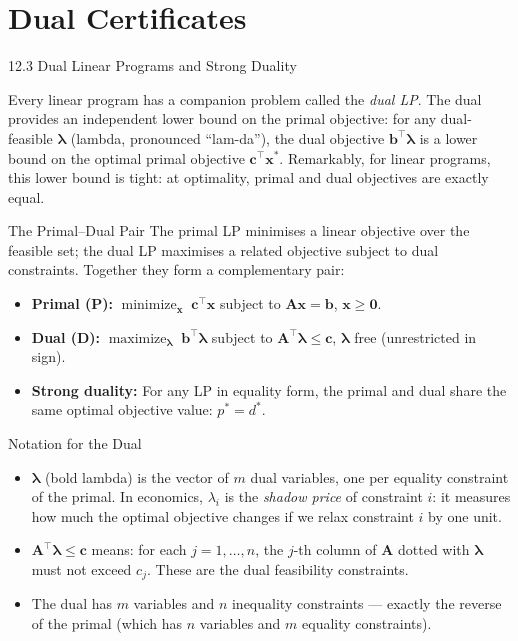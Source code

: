 \documentclass[aspectratio=169,10pt]{beamer}
\DeclareMathOperator*{\minimize}{minimize}
\DeclareMathOperator*{\maximize}{maximize}
\newcommand{\xv}{\mathbf{x}}
\newcommand{\cv}{\mathbf{c}}
\newcommand{\bv}{\mathbf{b}}
\newcommand{\Av}{\mathbf{A}}
\newcommand{\lav}{\boldsymbol{\lambda}}
\begin{document}
\section{Dual Certificates}

\begin{frame}[allowframebreaks]{12.3 Dual Linear Programs and Strong Duality}

Every linear program has a companion problem called the \emph{dual LP}.  The dual
provides an independent lower bound on the primal objective: for any dual-feasible
$\lav$ (lambda, pronounced ``lam-da''), the dual objective $\bv^\top\lav$ is a
lower bound on the optimal primal objective $\cv^\top\xv^*$.  Remarkably, for linear
programs, this lower bound is tight: at optimality, primal and dual objectives are
exactly equal.

\begin{block}{The Primal--Dual Pair}
The primal LP minimises a linear objective over the feasible set; the dual LP maximises
a related objective subject to dual constraints.  Together they form a complementary pair:
\begin{itemize}
  \item \textbf{Primal (P):} $\displaystyle\minimize_{\xv}\;\cv^\top\xv$
        subject to $\Av\xv = \bv$, $\xv \ge \mathbf{0}$.
  \item \textbf{Dual (D):} $\displaystyle\maximize_{\lav}\;\bv^\top\lav$
        subject to $\Av^\top\lav \le \cv$, $\lav$ free (unrestricted in sign).
  \item \textbf{Strong duality:} For any LP in equality form, the primal and dual share the
        same optimal objective value: $p^* = d^*$.
\end{itemize}
\end{block}

\begin{block}{Notation for the Dual}
\begin{itemize}
  \item $\lav$ (bold lambda) is the vector of $m$ dual variables, one per equality
        constraint of the primal.  In economics, $\lambda_i$ is the \emph{shadow price}
        of constraint $i$: it measures how much the optimal objective changes if we relax
        constraint $i$ by one unit.
  \item $\Av^\top\lav \le \cv$ means: for each $j = 1, \ldots, n$, the $j$-th column of
        $\Av$ dotted with $\lav$ must not exceed $c_j$.  These are the dual feasibility
        constraints.
  \item The dual has $m$ variables and $n$ inequality constraints --- exactly the reverse of
        the primal (which has $n$ variables and $m$ equality constraints).
\end{itemize}
\end{block}


\end{frame}
\end{document}
